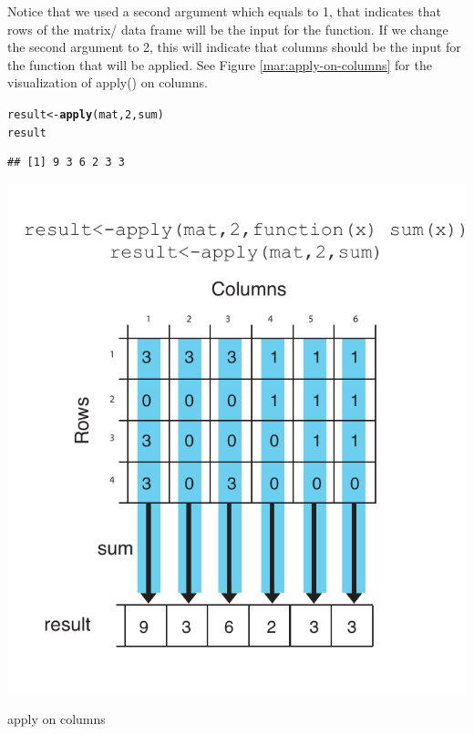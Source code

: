 \documentclass[english,nohyper]{tufte-book}\usepackage[]{graphicx}\usepackage[]{color}
\makeatletter
\newcommand{\hlnum}[1]{\textcolor[rgb]{0.686,0.059,0.569}{#1}}%
\newcommand{\hlstd}[1]{\textcolor[rgb]{0.345,0.345,0.345}{#1}}%
\newcommand{\hlkwb}[1]{\textcolor[rgb]{0.69,0.353,0.396}{#1}}%
\newcommand{\hlkwd}[1]{\textcolor[rgb]{0.737,0.353,0.396}{\textbf{#1}}}%
\newenvironment{kframe}{%
 \def\at@end@of@kframe{}%
 \ifinner\ifhmode%
  \def\at@end@of@kframe{\end{minipage}}%
  \begin{minipage}{\columnwidth}%
 \fi\fi%
 \def\FrameCommand##1{\hskip\@totalleftmargin \hskip-\fboxsep
 \colorbox{shadecolor}{##1}\hskip-\fboxsep
     \hskip-\linewidth \hskip-\@totalleftmargin \hskip\columnwidth}%
 \MakeFramed {\advance\hsize-\width
   \@totalleftmargin\z@ \linewidth\hsize
   \@setminipage}}%
 {\par\unskip\endMakeFramed%
 \at@end@of@kframe}
\newenvironment{knitrout}{}{} %
\makeatother
\begin{document}
Notice that we used a second argument which equals to 1, that indicates
that rows of the matrix/ data frame will be the input for the function.
If we change the second argument to 2, this will indicate that columns
should be the input for the function that will be applied. See Figure
\ref{mar:apply-on-columns} for the visualization of apply() on columns.

\begin{knitrout}
\color{fgcolor}\begin{kframe}
\begin{alltt}
\hlstd{result} \hlkwb{<-} \hlkwd{apply}\hlstd{(mat,} \hlnum{2}\hlstd{, sum)}
\hlstd{result}
\end{alltt}
\begin{verbatim}
## [1] 9 3 6 2 3 3
\end{verbatim}
\end{kframe}
\end{knitrout}


\begin{marginfigure}
\includegraphics[clip,scale=0.5]{2_Users_altuna_Dropbox_PAPERS_R-devel_compgenr_chapters_nonR_figures_apply2.pdf}

\caption{apply on columns\label{mar:apply-on-columns}}
\end{marginfigure}
\end{document}
